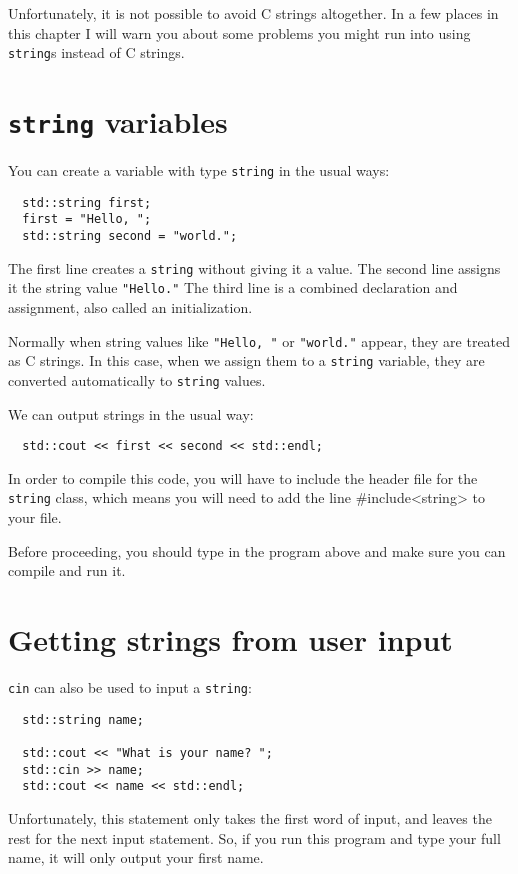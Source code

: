 Unfortunately, it is not possible to avoid C strings altogether.
In a few places in this chapter I will warn you about some problems
you might run into using {\tt string}s instead of C strings.

\section{{\tt string} variables}

You can create a variable with type {\tt string} in the usual
ways:

\begin{verbatim}
  std::string first;
  first = "Hello, ";
  std::string second = "world.";
\end{verbatim}
%
The first line creates a {\tt string} without giving it a value.
The second line assigns it the string value {\tt "Hello."}
The third line is a combined declaration and assignment, also
called an initialization.

Normally when string values like {\tt "Hello, "} or {\tt "world."}
appear, they are treated as C strings.  In this case, when we assign
them to a {\tt string} variable, they are converted automatically
to {\tt string} values.

We can output strings in the usual way:

\begin{verbatim}
  std::cout << first << second << std::endl;
\end{verbatim}
%

In order to compile this code, you will have to include the
header file for the {\tt string} class, which means you will need to
add the line \#include<string> to your file.  

Before proceeding, you should type in the program above and make
sure you can compile and run it.

\section{Getting strings from user input}

{\tt cin} can also be used to input a {\tt string}:

\begin{verbatim}
  std::string name;

  std::cout << "What is your name? ";
  std::cin >> name;
  std::cout << name << std::endl;
\end{verbatim}
%
Unfortunately, this statement only takes the first word of
input, and leaves the rest for the next input statement.
So, if you run this program and type your full name, it
will only output your first name.

